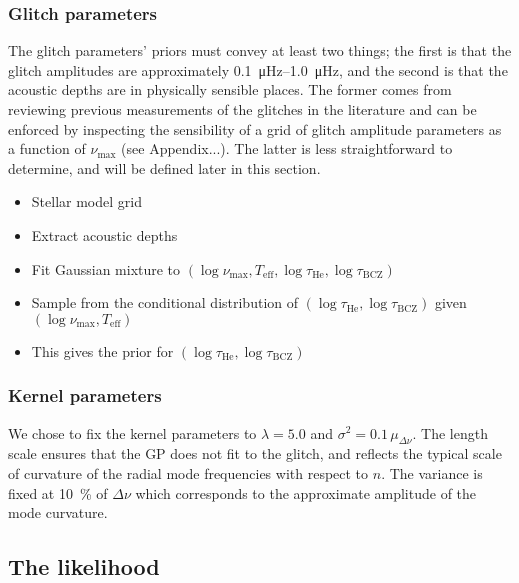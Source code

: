 \documentclass[linenumbers,modern]{aastex631}
\newcommand{\helium}{\mathrm{He}}
\newcommand{\bcz}{\mathrm{BCZ}}
\begin{document}
\subsubsection{Glitch parameters} \label{sec:glitch-params}

The glitch parameters' priors must convey at least two things; the first is
that the glitch amplitudes are approximately \SIrange{0.1}{1.0}{\micro\hertz}, 
and the second is that the acoustic depths are in physically sensible places.
The former comes from reviewing previous measurements of the glitches in the
literature and can be enforced by inspecting the sensibility of a grid of
glitch amplitude parameters as a function of \(\nu_\mathrm{max}\) (see
Appendix...). The latter is less straightforward to determine, and will be
defined later in this section.

\begin{itemize}
    \item Stellar model grid
    \item Extract acoustic depths
    \item Fit Gaussian mixture to \((\log\nu_\mathrm{max}, T_\mathrm{eff},
        \log\tau_\helium, \log\tau_\bcz)\)
    \item Sample from the conditional distribution of \((\log\tau_\helium,
        \log\tau_\bcz)\) given \((\log\nu_\mathrm{max}, T_\mathrm{eff})\)
    \item This gives the prior for \((\log\tau_\helium, \log\tau_\bcz)\)
\end{itemize}

\subsubsection{Kernel parameters} \label{sec:kernel-params}

We chose to fix the kernel parameters to \(\lambda = 5.0\) and \(\sigma^2 =
0.1 \, \mu_{\Delta\nu}\). The length scale ensures that the GP does not fit to
the glitch, and reflects the typical scale of curvature of the radial mode
frequencies with respect to \(n\). The variance is fixed at \SI{10}{\percent}
of \(\Delta\nu\) which corresponds to the approximate amplitude of the mode
curvature.

\subsection{The likelihood}
\end{document}
